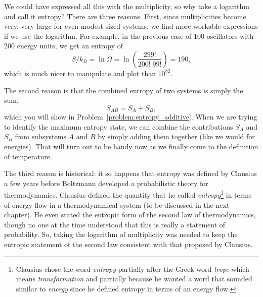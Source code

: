 We could have expressed all this with the multiplicity, so why
take a logarithm and call it entropy?  There are three reasons.  First,
since multiplicities become very, very large for even modest sized
systems, we find more workable expressions if we use the
logarithm.  For example, in the previous case of 100 oscillators with
200 energy units, we get an entropy of
\begin{equation}
 S/k_B = \ln\Omega = \ln\left(\frac{299!}{200!\;99!}\right) = 190 ,
\end{equation}
which is much nicer to manipulate and plot than $10^{82}$.

The second reason is that the combined entropy of two systems is
simply the sum,
\begin{equation}
S_{AB} = S_A + S_B,
\end{equation}
which you will show in Problem~\ref{problem:entropy_additive}.  When we
are trying to identify the maximum entropy state, we can combine the
contributions $S_A$ and $S_B$ from subsystems $A$ and $B$ by simply
adding them together (like we would for energies).  That will turn out
to be handy now as we finally come to the definition of temperature.

The third reason is historical: it so happens that entropy was defined
by Clausius a few years before Boltzmann developed a probabilistic
theory for thermodynamics. Clausius defined the quantity that he
called {\em entropy}\footnote{Clausius chose the word {\em entropy}
  partially after the Greek word {\em trope} which means {\em
    transformation} and partially because he wanted a word that
  sounded similar to {\em energy} since he defined entropy in terms of
  an energy flow.}  in terms of energy flow in a thermodynamical
system (to be discussed in the next chapter).  He even stated the
entropic form of the second law of thermodynamics, though no one
at the time understood that this is really a statement of probability.
So, taking the logarithm of multiplicity was needed to keep the
entropic statement of the second law consistent with that proposed by
Clausius.


